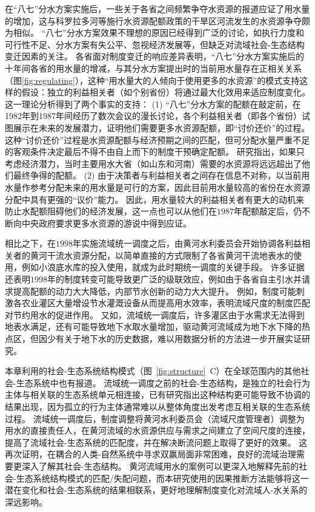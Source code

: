在“八七”分水方案实施后，一些关于各省之间频繁争夺水资源的报道应证了用水量的增加，这与科罗拉多河等施行水资源配额政策的干旱区河流发生的水资源争夺颇为相似\cite{grafton2013, schmandt2021a}。
“八七”分水方案效果不理想的原因已经得到广泛的讨论，如执行力度和可行性不足、分水方案有失公平、忽视经济发展等，但缺乏对流域社会-生态结构变迁因素的关注\cite{wang2019b,wang2019a}。
各省面对制度变迁的响应差异表明，“八七”分水方案实施后的十年间各省的用水量的增减，与其分水方案提出时的当前用水量存在正相关关系（图\ref{fig:regulating}），这种“用水量大的人倾向于使用更多的水资源”的模式支持这样的假设：独立的利益相关者（如个别省份）将通过最大化效用来适应制度变化。
这一理论分析得到了两个事实的支持：
(1) “八七”分水方案的配额在敲定前，在1982年到1987年间经历了数次会议的漫长讨论，各个利益相关者（即各个省份）试图展示在未来的发展潜力，证明他们需要更多水资源配额，即“讨价还价”的过程\cite{wang2019a, wang2019d}。
这种“讨价还价”过程是水资源配额与经济预期之间的匹配，但可分配水量严重不足的客观条件决定最后不得不由自上而下的制度干预确定配额。
研究指出，如果只考虑经济潜力，当时主要用水大省（如山东和河南）需要的水资源将远远超出了他们最终争得的配额\cite{zuo2020}。
(2) 由于决策者与利益相关者之间存在信息不对称，以当前用水量作参考分配未来的用水量是可行的方案，因此目前用水量较高的省份在水资源分配中具有更强的“议价”能力。
因此，用水量较大的利益相关者有更大的动机来防止水配额阻碍他们的经济发展，这一点也可以从他们在$1987$年配额敲定后，仍不断向中央政府要求更多水资源的游说中得到应证\cite{wang2019a, wang2019d}。


相比之下，在$1998$年实施流域统一调度之后，由黄河水利委员会开始协调各利益相关者的黄河干流水资源分配，以简单直接的方式限制了各省黄河干流地表水的使用，例如小浪底水库的投入使用，就成为此时期统一调度的关键手段。
许多证据还表明$1998$年的制度转变可能导致更广泛的级联效应，例如由于各省自主引水并请求提高配额的动力大大降低，内部节水创新的动力大大提升。
例如，制度可能刺激各农业灌区大量增设节水灌溉设备从而提高用水效率，表明流域尺度的制度匹配对节约用水的促进作用\cite{krieger1955, ostrom1990}。
又如，流域统一调度后，许多灌区由于水需求无法得到地表水满足，还有可能导致地下水取水量增加，驱动黄河流域成为地下水下降的热点区\cite{sun2022b}，但因少有关于地下水的历史数据，难以用数据分析的方法进一步开展实证研究。

本章利用的社会-生态系统结构模式（图~\ref{fig:structure}~C）在全球范围内的其他社会-生态系统中也有报道。
流域统一调度之前的社会-生态结构，是独立的社会行为主体与相关联的生态系统单元相连接，已有研究指出这种结构更可能导致不协调的结果出现，因为孤立的行为主体通常难以从整体角度出发考虑互相关联的生态系统过程\cite{sayles2017,sayles2019,cai2016,bergsten2019}。
流域统一调度后，制度调整将黄河水利委员会（流域尺度管理者）调整为用水的直接责任人，在黄河流域的水资源供应与需求之间建立了空间尺度的连接，提高了流域社会-生态系统的匹配度，并在解决断流问题上取得了更好的效果\cite{cumming2020a,wang2019d}。
这再次证明，在耦合的人类-自然系统中寻求双赢局面非常困难\cite{hegwood2022}，良好的流域治理需要更深入了解其社会-生态结构\cite{bergsten2019, sayles2019}。
黄河流域用水的案例可以更深入地解释先前的社会-生态系统结构模式的匹配/失配问题，而本研究使用的因果推断方法能够将这一潜在变化和社会-生态系统的结果相联系，更好地理解制度变化对流域人-水关系的深远影响。

